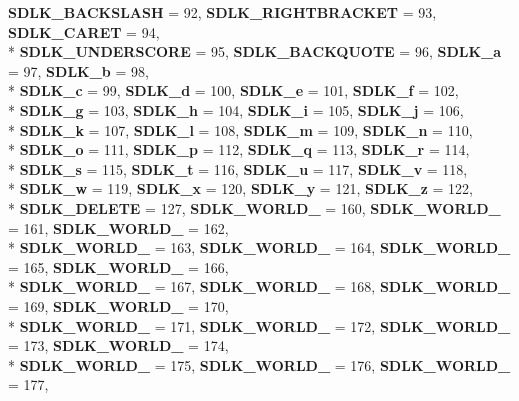 \begin{DoxyCompactItemize}
{\bf S\+D\+L\+K\+\_\+\+B\+A\+C\+K\+S\+L\+A\+S\+H} = 92, 
{\bf S\+D\+L\+K\+\_\+\+R\+I\+G\+H\+T\+B\+R\+A\+C\+K\+E\+T} = 93, 
{\bf S\+D\+L\+K\+\_\+\+C\+A\+R\+E\+T} = 94, 
\\*
{\bf S\+D\+L\+K\+\_\+\+U\+N\+D\+E\+R\+S\+C\+O\+R\+E} = 95, 
{\bf S\+D\+L\+K\+\_\+\+B\+A\+C\+K\+Q\+U\+O\+T\+E} = 96, 
{\bf S\+D\+L\+K\+\_\+a} = 97, 
{\bf S\+D\+L\+K\+\_\+b} = 98, 
\\*
{\bf S\+D\+L\+K\+\_\+c} = 99, 
{\bf S\+D\+L\+K\+\_\+d} = 100, 
{\bf S\+D\+L\+K\+\_\+e} = 101, 
{\bf S\+D\+L\+K\+\_\+f} = 102, 
\\*
{\bf S\+D\+L\+K\+\_\+g} = 103, 
{\bf S\+D\+L\+K\+\_\+h} = 104, 
{\bf S\+D\+L\+K\+\_\+i} = 105, 
{\bf S\+D\+L\+K\+\_\+j} = 106, 
\\*
{\bf S\+D\+L\+K\+\_\+k} = 107, 
{\bf S\+D\+L\+K\+\_\+l} = 108, 
{\bf S\+D\+L\+K\+\_\+m} = 109, 
{\bf S\+D\+L\+K\+\_\+n} = 110, 
\\*
{\bf S\+D\+L\+K\+\_\+o} = 111, 
{\bf S\+D\+L\+K\+\_\+p} = 112, 
{\bf S\+D\+L\+K\+\_\+q} = 113, 
{\bf S\+D\+L\+K\+\_\+r} = 114, 
\\*
{\bf S\+D\+L\+K\+\_\+s} = 115, 
{\bf S\+D\+L\+K\+\_\+t} = 116, 
{\bf S\+D\+L\+K\+\_\+u} = 117, 
{\bf S\+D\+L\+K\+\_\+v} = 118, 
\\*
{\bf S\+D\+L\+K\+\_\+w} = 119, 
{\bf S\+D\+L\+K\+\_\+x} = 120, 
{\bf S\+D\+L\+K\+\_\+y} = 121, 
{\bf S\+D\+L\+K\+\_\+z} = 122, 
\\*
{\bf S\+D\+L\+K\+\_\+\+D\+E\+L\+E\+T\+E} = 127, 
{\bf S\+D\+L\+K\+\_\+\+W\+O\+R\+L\+D\+\_} = 160, 
{\bf S\+D\+L\+K\+\_\+\+W\+O\+R\+L\+D\+\_} = 161, 
{\bf S\+D\+L\+K\+\_\+\+W\+O\+R\+L\+D\+\_} = 162, 
\\*
{\bf S\+D\+L\+K\+\_\+\+W\+O\+R\+L\+D\+\_} = 163, 
{\bf S\+D\+L\+K\+\_\+\+W\+O\+R\+L\+D\+\_} = 164, 
{\bf S\+D\+L\+K\+\_\+\+W\+O\+R\+L\+D\+\_} = 165, 
{\bf S\+D\+L\+K\+\_\+\+W\+O\+R\+L\+D\+\_} = 166, 
\\*
{\bf S\+D\+L\+K\+\_\+\+W\+O\+R\+L\+D\+\_} = 167, 
{\bf S\+D\+L\+K\+\_\+\+W\+O\+R\+L\+D\+\_} = 168, 
{\bf S\+D\+L\+K\+\_\+\+W\+O\+R\+L\+D\+\_} = 169, 
{\bf S\+D\+L\+K\+\_\+\+W\+O\+R\+L\+D\+\_} = 170, 
\\*
{\bf S\+D\+L\+K\+\_\+\+W\+O\+R\+L\+D\+\_} = 171, 
{\bf S\+D\+L\+K\+\_\+\+W\+O\+R\+L\+D\+\_} = 172, 
{\bf S\+D\+L\+K\+\_\+\+W\+O\+R\+L\+D\+\_} = 173, 
{\bf S\+D\+L\+K\+\_\+\+W\+O\+R\+L\+D\+\_} = 174, 
\\*
{\bf S\+D\+L\+K\+\_\+\+W\+O\+R\+L\+D\+\_} = 175, 
{\bf S\+D\+L\+K\+\_\+\+W\+O\+R\+L\+D\+\_} = 176, 
{\bf S\+D\+L\+K\+\_\+\+W\+O\+R\+L\+D\+\_} = 177, 

\end{DoxyCompactItemize}
